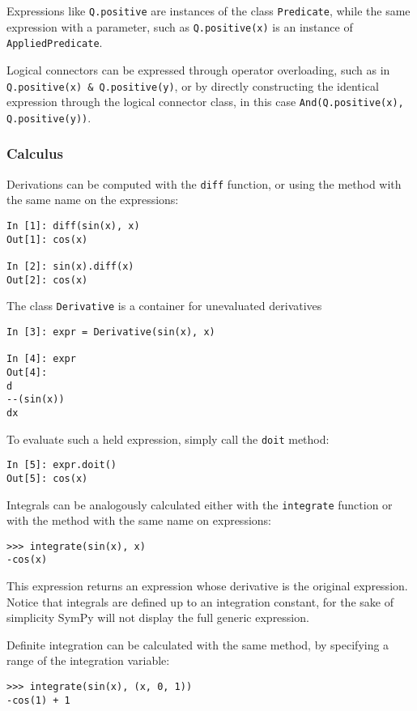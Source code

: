 Expressions like \verb|Q.positive| are instances of the class \verb|Predicate|,
while the same expression with a parameter, such as \verb|Q.positive(x)| is an
instance of \verb|AppliedPredicate|.

Logical connectors can be expressed through operator overloading,
such as in \verb|Q.positive(x) & Q.positive(y)|,
or by directly constructing the identical expression through the
logical connector class, in this case \verb|And(Q.positive(x), Q.positive(y))|.


\subsubsection{Calculus}


Derivations can be computed with the \verb|diff| function,
or using the method with the same name on the expressions:

\begin{verbatim}
In [1]: diff(sin(x), x)
Out[1]: cos(x)

In [2]: sin(x).diff(x)
Out[2]: cos(x)
\end{verbatim}

The class \verb|Derivative| is a container for unevaluated derivatives

\begin{verbatim}
In [3]: expr = Derivative(sin(x), x)

In [4]: expr
Out[4]:
d
--(sin(x))
dx
\end{verbatim}

To evaluate such a held expression, simply call the \verb|doit| method:

\begin{verbatim}
In [5]: expr.doit()
Out[5]: cos(x)
\end{verbatim}

Integrals can be analogously calculated either with the \verb|integrate| function
or with the method with the same name on expressions:
\begin{verbatim}
>>> integrate(sin(x), x)
-cos(x)
\end{verbatim}
This expression returns an expression whose derivative is the original expression.
Notice that integrals are defined up to an integration constant,
for the sake of simplicity SymPy will not display the full generic expression.

Definite integration can be calculated with the same method, by specifying a
range of the integration variable:
\begin{verbatim}
>>> integrate(sin(x), (x, 0, 1))
-cos(1) + 1
\end{verbatim}

